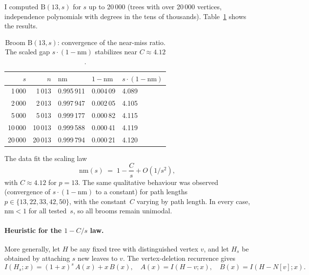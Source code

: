 \documentclass[12pt,oneside]{article}
\theoremstyle{remark}
\newcommand{\nm}{\mathrm{nm}}             %
\newcommand{\broom}{\mathrm{B}}           %
\begin{document}
I computed $\broom(13, s)$ for $s$ up to 20\,000 (trees with over 20\,000 vertices, independence polynomials with degrees in the tens of thousands).
Table~\ref{tab:broom} shows the results.

\begin{table}[ht]
  \centering
  \caption{Broom $\broom(13, s)$: convergence of the near-miss ratio.
    The scaled gap $s \cdot (1 - \nm)$ stabilizes near $C \approx 4.12$.}
  \label{tab:broom}
  \begin{tabular}{r r l l l}
    \toprule
    $s$ & $n$ & $\nm$ & $1 - \nm$ & $s \cdot (1 - \nm)$ \\
    \midrule
    1\,000  & 1\,013  & 0.995\,911 & 0.004\,09 & 4.089 \\
    2\,000  & 2\,013  & 0.997\,947 & 0.002\,05 & 4.105 \\
    5\,000  & 5\,013  & 0.999\,177 & 0.000\,82 & 4.115 \\
    10\,000 & 10\,013 & 0.999\,588 & 0.000\,41 & 4.119 \\
    20\,000 & 20\,013 & 0.999\,794 & 0.000\,21 & 4.120 \\
    \bottomrule
  \end{tabular}
\end{table}

The data fit the scaling law
\begin{equation}\label{eq:scaling}
  \nm(s) \;=\; 1 - \frac{C}{s} + O(1/s^2),
\end{equation}
with $C \approx 4.12$ for $p = 13$.
The same qualitative behaviour was observed (convergence of $s \cdot (1 - \nm)$ to a constant) for path lengths $p \in \{13, 22, 33, 42, 50\}$, with the constant~$C$ varying by path length.
In every case, $\nm < 1$ for all tested~$s$, so all brooms remain unimodal.

\paragraph*{Heuristic for the $1 - C/s$ law.}
More generally, let $H$ be any fixed tree with distinguished vertex $v$, and let $H_s$ be obtained
by attaching $s$ new leaves to $v$. The vertex-deletion recurrence gives
\[
  I(H_s; x) = (1+x)^s\, A(x) + x\, B(x),
  \quad A(x) = I(H - v; x), \quad B(x) = I(H - N[v]; x).
\]
\end{document}
